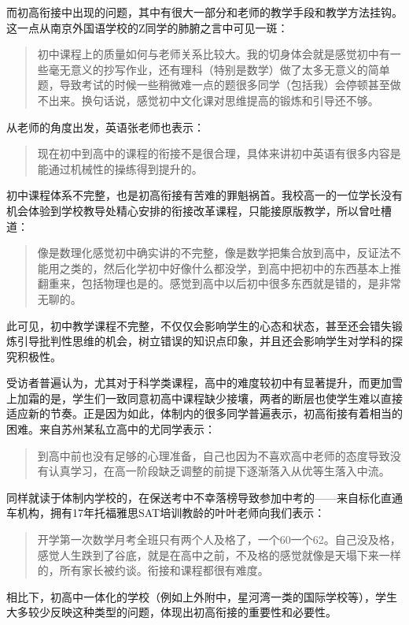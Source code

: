\documentclass[12pt,UTF8]{ctexart}
\begin{document}
\par{
	而初高衔接中出现的问题，其中有很大一部分和老师的教学手段和教学方法挂钩。这一点从南京外国语学校的Z同学的肺腑之言中可见一斑：
	\begin{quote}
		\kaishu
		初中课程上的质量如何与老师关系比较大。我的切身体会就是感觉初中有一些毫无意义的抄写作业，还有理科（特别是数学）做了太多无意义的简单题，导致考试的时候一些稍微难一点的题很多同学（包括我）会停顿甚至做不出来。换句话说，感觉初中文化课对思维提高的锻炼和引导还不够。
	\end{quote}
	从老师的角度出发，英语张老师也表示：
	\begin{quote}
		\kaishu 现在初中到高中的课程的衔接不是很合理，具体来讲初中英语有很多内容是能通过机械性的操练得到提升的。
	\end{quote}
	初中课程体系不完整，也是初高衔接有苦难的罪魁祸首。我校高一的一位学长没有机会体验到学校教导处精心安排的衔接改革课程，只能接原版教学，所以曾吐槽道：
	\begin{quote}
		\kaishu
		像是数理化感觉初中确实讲的不完整，像是数学把集合放到高中，反证法不能用之类的，然后化学初中好像什么都没学，到高中把初中的东西基本上推翻重来，包括物理也是的。感觉到高中以后初中很多东西就是错的，是非常无聊的。
	\end{quote}
	此可见，初中教学课程不完整，不仅仅会影响学生的心态和状态，甚至还会错失锻炼引导批判性思维的机会，树立错误的知识点印象，并且还会影响学生对学科的探究积极性。
}
\par {
	
	受访者普遍认为，尤其对于科学类课程，高中的难度较初中有显著提升，而更加雪上加霜的是，学生们一致同意初高中课程缺少接壤，两者的断层也使学生难以直接适应新的节奏。正是因为如此，体制内的很多同学普遍表示，初高衔接有着相当的困难。来自苏州某私立高中的尤同学表示：\begin{quote}
		\kaishu 到高中前也没有足够的心理准备，自己也因为不喜欢高中老师的态度导致没有认真学习，在高一阶段缺乏调整的前提下逐渐落入从优等生落入中流。
	\end{quote}
	同样就读于体制内学校的，在保送考中不幸落榜导致参加中考的——来自标化直通车机构，拥有17年托福雅思SAT培训教龄的叶叶老师向我们表示：
	\begin{quote}
		\kaishu
		开学第一次数学月考全班只有两个人及格了，一个60一个62。自己没及格，感觉人生跌到了谷底，就是在高中之前，不及格的感觉就像是天塌下来一样的，所有家长被约谈。衔接和课程都很有难度。
	\end{quote}
	相比下，初高中一体化的学校（例如上外附中，星河湾一类的国际学校等），学生大多较少反映这种类型的问题，体现出初高衔接的重要性和必要性。
}
\end{document}
